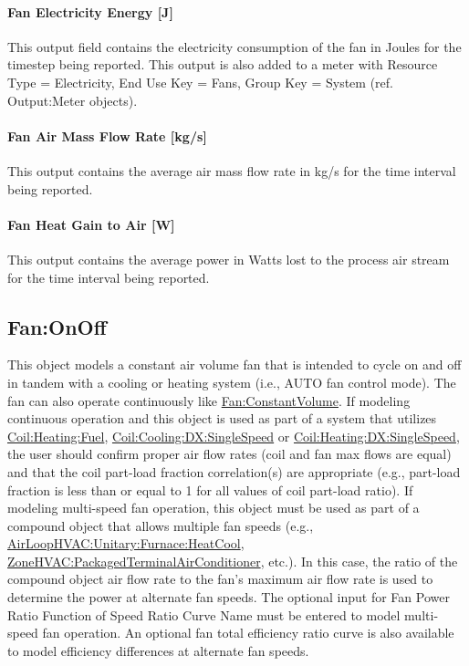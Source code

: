 \paragraph{Fan Electricity Energy {[}J{]}}\label{fan-electric-energy-j}

This output field contains the electricity consumption of the fan in Joules for the timestep being reported. This output is also added to a meter with Resource Type = Electricity, End Use Key = Fans, Group Key = System (ref. Output:Meter objects).

\paragraph{Fan Air Mass Flow Rate {[}kg/s{]}}\label{fan-air-mass-flow-kgs}

This output contains the average air mass flow rate in kg/s for the time interval being reported.

\paragraph{Fan Heat Gain to Air {[}W{]}}\label{fan-heat-gain-to-air-w}

This output contains the average power in Watts lost to the process air stream for the time interval being reported.

\subsection{Fan:OnOff}\label{fanonoff}

This object models a constant air volume fan that is intended to cycle on and off in tandem with a cooling or heating system (i.e., AUTO fan control mode). The fan can also operate continuously like \hyperref[fanconstantvolume]{Fan:ConstantVolume}. If modeling continuous operation and this object is used as part of a system that utilizes \hyperref[coilheatinggas-000]{Coil:Heating:Fuel}, \hyperref[coilcoolingdxsinglespeed]{Coil:Cooling:DX:SingleSpeed} or \hyperref[coilheatingdxsinglespeed]{Coil:Heating:DX:SingleSpeed}, the user should confirm proper air flow rates (coil and fan max flows are equal) and that the coil part-load fraction correlation(s) are appropriate (e.g., part-load fraction is less than or equal to 1 for all values of coil part-load ratio). If modeling multi-speed fan operation, this object must be used as part of a compound object that allows multiple fan speeds (e.g., \hyperref[airloophvacunitaryfurnaceheatcool]{AirLoopHVAC:Unitary:Furnace:HeatCool}, \hyperref[zonehvacpackagedterminalairconditioner]{ZoneHVAC:PackagedTerminalAirConditioner}, etc.). In this case, the ratio of the compound object air flow rate to the fan's maximum air flow rate is used to determine the power at alternate fan speeds. The optional input for Fan Power Ratio Function of Speed Ratio Curve Name must be entered to model multi-speed fan operation. An optional fan total efficiency ratio curve is also available to model efficiency differences at alternate fan speeds.

